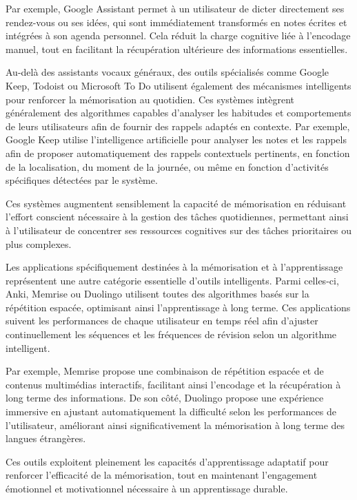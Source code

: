 \documentclass[11pt,a4paper]{report}
\begin{document}
Par exemple, Google Assistant permet à un utilisateur de dicter directement ses rendez-vous ou ses idées, qui sont immédiatement transformés en notes écrites et intégrées à son agenda personnel. Cela réduit la charge cognitive liée à l’encodage manuel, tout en facilitant la récupération ultérieure des informations essentielles.

Au-delà des assistants vocaux généraux, des outils spécialisés comme Google Keep, Todoist ou Microsoft To Do utilisent également des mécanismes intelligents pour renforcer la mémorisation au quotidien. Ces systèmes intègrent généralement des algorithmes capables d’analyser les habitudes et comportements de leurs utilisateurs afin de fournir des rappels adaptés en contexte. Par exemple, Google Keep utilise l’intelligence artificielle pour analyser les notes et les rappels afin de proposer automatiquement des rappels contextuels pertinents, en fonction de la localisation, du moment de la journée, ou même en fonction d'activités spécifiques détectées par le système.

Ces systèmes augmentent sensiblement la capacité de mémorisation en réduisant l’effort conscient nécessaire à la gestion des tâches quotidiennes, permettant ainsi à l’utilisateur de concentrer ses ressources cognitives sur des tâches prioritaires ou plus complexes.

Les applications spécifiquement destinées à la mémorisation et à l’apprentissage représentent une autre catégorie essentielle d’outils intelligents. Parmi celles-ci, Anki, Memrise ou Duolingo utilisent toutes des algorithmes basés sur la répétition espacée, optimisant ainsi l'apprentissage à long terme. Ces applications suivent les performances de chaque utilisateur en temps réel afin d’ajuster continuellement les séquences et les fréquences de révision selon un algorithme intelligent.

Par exemple, Memrise propose une combinaison de répétition espacée et de contenus multimédias interactifs, facilitant ainsi l’encodage et la récupération à long terme des informations. De son côté, Duolingo propose une expérience immersive en ajustant automatiquement la difficulté selon les performances de l’utilisateur, améliorant ainsi significativement la mémorisation à long terme des langues étrangères.

Ces outils exploitent pleinement les capacités d’apprentissage adaptatif pour renforcer l'efficacité de la mémorisation, tout en maintenant l’engagement émotionnel et motivationnel nécessaire à un apprentissage durable.
\end{document}
